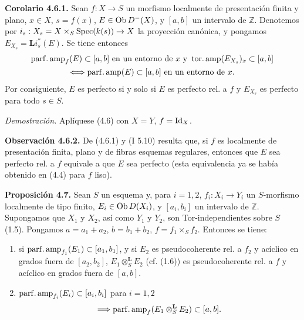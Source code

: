 \providecommand{\sisi}[2]{#2}

\textbf{Corolario 4.6.1.} Sean \(f:X\to S\) un morfismo localmente de presentación finita y plano, \(x\in X\), \(s=f(x)\), \(E\in\operatorname{Ob} D^-(X)\), y \([a,b]\) un intervalo de \(\mathbb Z\). Denotemos por \(i_s:X_s=X\times_S\operatorname{Spec}(k(s))\to X\) la proyección canónica, y pongamos \(E_{X_s}=\mathbf Li_s^*(E)\). Se tiene entonces
\[
\begin{gathered}
 \operatorname{parf.amp}_f(E)\subset[a,b]\text{ en un entorno de }x\text{ y }\operatorname{tor.amp}(E_{X_s})_x\subset[a,b]\\
 \Longleftrightarrow \operatorname{parf.amp}(E)\subset[a,b]\text{ en un entorno de }x.
\end{gathered}
\]
Por consiguiente, \(E\) es perfecto si y solo si \(E\) es perfecto rel. a \(f\) y \(E_{X_s}\) es perfecto para todo \(s\in S\).

\emph{Demostración.} Aplíquese (4.6) con \(X=Y\), \(f=\operatorname{Id}_X\).

\textbf{Observación 4.6.2.} De (4.6.1) y (I 5.10) resulta que, si \(f\) es localmente de presentación finita, plano y de fibras esquemas regulares, entonces que \(E\) sea perfecto rel. a \(f\) equivale a que \(E\) sea perfecto (esta equivalencia ya se había obtenido en (4.4) para \(f\) liso).

\textbf{Proposición 4.7.} Sean \(S\) un esquema y, para \(i=1,2\), \(f_i:X_i\to Y_i\) un \(S\)-morfismo localmente de tipo finito, \(E_i\in\operatorname{Ob} D(X_i)\), y \([a_i,b_i]\) un intervalo de \(\mathbb Z\). Supongamos que \(X_1\) y \(X_2\), así como \(Y_1\) y \(Y_2\), son Tor-independientes sobre \(S\) (1.5). Pongamos \(a=a_1+a_2\), \(b=b_1+b_2\), \(f=f_1\times_Sf_2\). Entonces se tiene:
\begin{enumerate}[label=\alph*)]
\item si \(\operatorname{parf.amp}_{f_1}(E_1)\subset[a_1,b_1]\), y si \(E_2\) es pseudocoherente rel. a \(f_2\) y acíclico en grados fuera de \([a_2,b_2]\), \(E_1\otimes_S^{\mathbf L}E_2\) (cf. (1.6)) es pseudocoherente rel. a \(f\) y acíclico en grados fuera de \([a,b]\).
\item \(\operatorname{parf.amp}_{f_i}(E_i)\subset[a_i,b_i]\) para \(i=1,2\)
\[
 \Longrightarrow\operatorname{parf.amp}_f(E_1\otimes_S^{\mathbf L}E_2)\subset[a,b].
\]
\end{enumerate}
